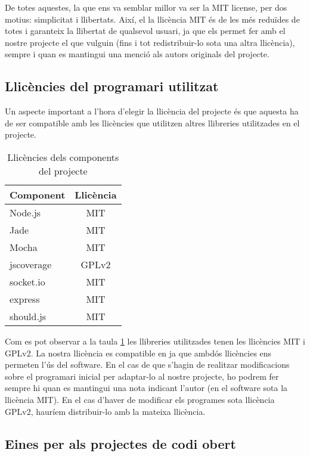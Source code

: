De totes aquestes, la que ens va semblar millor va ser la MIT license, per dos motius: simplicitat i llibertats. Així, el la llicència MIT és de les més reduïdes de totes i garanteix la llibertat de qualsevol usuari, ja que els permet fer amb el nostre projecte el que vulguin (fins i tot redistribuir-lo sota una altra llicència), sempre i quan es mantingui una menció als autors originals del projecte.

\subsection{Llicències del programari utilitzat}

Un aspecte important a l'hora d'elegir la llicència del projecte és que aquesta ha de ser compatible amb les llicències que utilitzen altres llibreries utilitzades en el projecte. 

\begin{table}[htbp]\begin{center}\begin{tabular}{|l|c|}
\hline
\textbf{Component} & \textbf{Llicència} \\ \hline
Node.js & MIT \\ \hline
Jade & MIT\\ \hline
Mocha & MIT \\ \hline
jscoverage & GPLv2 \\ \hline
socket.io & MIT \\ \hline
express & MIT  \\ \hline
should.js & MIT \\ \hline
\end{tabular}\end{center}
\caption{Llicències dels components del projecte}\label{t:llicencies-components}
\end{table} 

Com es pot observar a la taula \ref{t:llicencies-components} les llibreries utilitzades tenen les llicències MIT i GPLv2. La nostra llicència es compatible en ja que ambdós llicències ens permeten l'ús del software. En el cas de que s'hagin de realitzar modificacions sobre el programari inicial per adaptar-lo al nostre projecte, ho podrem fer sempre hi quan es mantingui una nota indicant l'autor (en el software sota la llicència MIT). En el cas d'haver de modificar els programes sota llicència GPLv2, hauríem distribuir-lo amb la mateixa llicència. 

\subsection{Eines per als projectes de codi obert}

